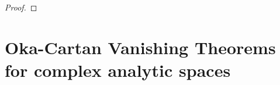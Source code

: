             \begin{theorem} \label{theorem: zariski_main_theorem}
                
            \end{theorem}
                \begin{proof}
                    
                \end{proof}

            \begin{theorem} \label{theorem: stein_factorisation}
                
            \end{theorem}

    \section{Oka-Cartan Vanishing Theorems for complex analytic spaces}
